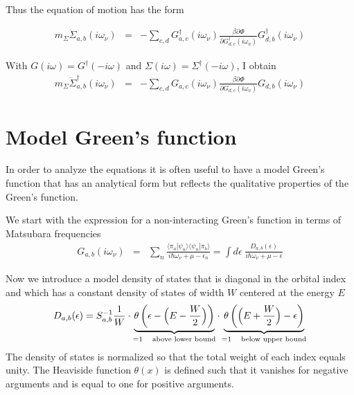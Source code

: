 \documentclass[11pt,a4paper]{report}
\begin{document}
Thus the equation of motion has the form

\begin{eqnarray*}
m_\Sigma
\ddot{\Sigma}_{a,b}(i\omega_\nu)
&=&-
\sum_{c,d}
G^\dagger_{a,c}(i\omega_\nu)
\frac{\beta\partial\Phi}{\partial G^\dagger_{d,c}(i\omega_\nu)}
G^\dagger_{d,b}(i\omega_\nu)
\end{eqnarray*}

With $G(i\omega)=G^\dagger(-i\omega)$ and
$\Sigma(i\omega)=\Sigma^\dagger(-i\omega)$, I obtain
\begin{eqnarray*}
m_\Sigma
\ddot{\Sigma}^\dagger_{a,b}(i\omega_\nu)
&=&-
\sum_{c,d}
G_{a,c}(i\omega_\nu)
\frac{\beta\partial\Phi}{\partial G_{d,c}(i\omega_\nu)}
G_{d,b}(i\omega_\nu)
\end{eqnarray*}


\section{Model Green's function}
\label{sec:modelgreensfunction}
In order to analyze the equations it is often useful to have a model
Green's function that has an analytical form but reflects the
qualitative properties of the Green's function.

We start with the expression for a non-interacting Green's
function in terms of Matsubara frequencies
\begin{eqnarray}
G_{a,b}(i\omega_\nu)
&=&
\sum_n\frac{\langle\pi_a|\psi_n\rangle
\langle\psi_n|\pi_b\rangle}{i\hbar\omega_\nu+\mu-\epsilon_n}
=
\int d\epsilon\;\frac{D_{a,b}(\epsilon)}{i\hbar\omega_\nu+\mu-\epsilon}
\end{eqnarray}

Now we introduce a model density of states that is diagonal in the
orbital index and which has a constant density of states of width $W$
centered at the energy $E$
\begin{eqnarray}
D_{a,b}(\epsilon)=S^{-1}_{a,b}\frac{1}{W}
\cdot
\underbrace{\theta\left(\epsilon-\Bigl(E-\frac{W}{2}\Bigr)\right)
}_{=1\quad\text{above lower bound}}
\cdot\underbrace{
\theta\left(\Bigl(E+\frac{W}{2}\Bigr)-\epsilon\right)
}_{=1\quad\text{below upper bound}}
\end{eqnarray}
The density of states is normalized so that the total weight of each
index equals unity. The Heaviside function $\theta(x)$ is defined such
that it vanishes for negative arguments and is equal to one for
positive arguments.
\end{document}
